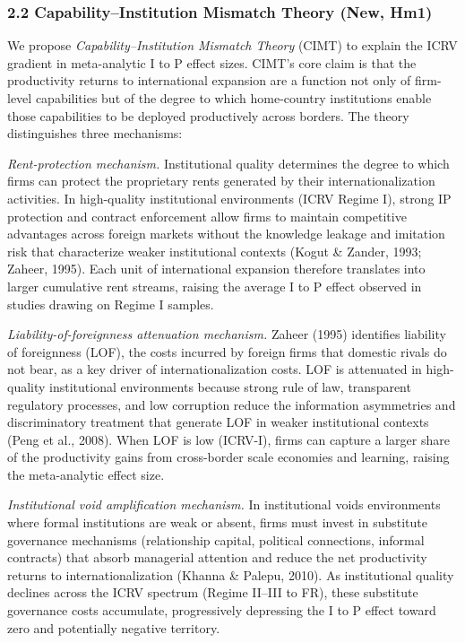 \documentclass[
  12pt,a4paper]{article}
\begin{document}
\hypertarget{capabilityinstitution-mismatch-theory-new-hm1}{%
\subsubsection{2.2 Capability--Institution Mismatch Theory (New,
Hm1)}\label{capabilityinstitution-mismatch-theory-new-hm1}}

We propose \emph{Capability--Institution Mismatch Theory} (CIMT) to
explain the ICRV gradient in meta-analytic I to P effect sizes. CIMT's
core claim is that the productivity returns to international expansion
are a function not only of firm-level capabilities but of the degree to
which home-country institutions enable those capabilities to be deployed
productively across borders. The theory distinguishes three mechanisms:

\emph{Rent-protection mechanism.} Institutional quality determines the
degree to which firms can protect the proprietary rents generated by
their internationalization activities. In high-quality institutional
environments (ICRV Regime I), strong IP protection and contract
enforcement allow firms to maintain competitive advantages across
foreign markets without the knowledge leakage and imitation risk that
characterize weaker institutional contexts (Kogut \& Zander, 1993;
Zaheer, 1995). Each unit of international expansion therefore translates
into larger cumulative rent streams, raising the average I to P effect
observed in studies drawing on Regime I samples.

\emph{Liability-of-foreignness attenuation mechanism.} Zaheer (1995)
identifies liability of foreignness (LOF), the costs incurred by foreign
firms that domestic rivals do not bear, as a key driver of
internationalization costs. LOF is attenuated in high-quality
institutional environments because strong rule of law, transparent
regulatory processes, and low corruption reduce the information
asymmetries and discriminatory treatment that generate LOF in weaker
institutional contexts (Peng et al., 2008). When LOF is low (ICRV-I),
firms can capture a larger share of the productivity gains from
cross-border scale economies and learning, raising the meta-analytic
effect size.

\emph{Institutional void amplification mechanism.} In institutional
voids environments where formal institutions are weak or absent, firms
must invest in substitute governance mechanisms (relationship capital,
political connections, informal contracts) that absorb managerial
attention and reduce the net productivity returns to
internationalization (Khanna \& Palepu, 2010). As institutional quality
declines across the ICRV spectrum (Regime II--III to FR), these
substitute governance costs accumulate, progressively depressing the I
to P effect toward zero and potentially negative territory.
\end{document}
